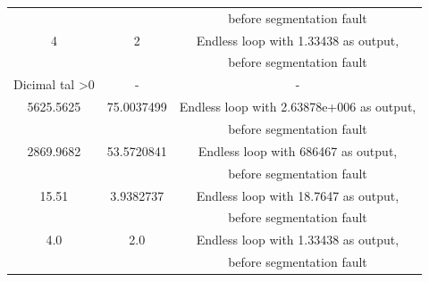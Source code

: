 \documentclass[11pt]{article}
\begin{document}
\begin{center}
\begin{tabular}{ |c|c|c| }
              && before segmentation fault \\
              4 & 2 & Endless loop with 1.33438 as output,\\ 
              && before segmentation fault \\
             Dicimal tal \textgreater 0 & - & - \\
              5625.5625 & 75.0037499 & Endless loop with 2.63878e+006 as output,\\ 
              && before segmentation fault \\
              2869.9682 & 53.5720841 & Endless loop with 686467 as output,\\ 
              && before segmentation fault \\
              15.51 & 3.9382737 & Endless loop with 18.7647 as output,\\ 
              && before segmentation fault \\
              4.0 & 2.0 & Endless loop with 1.33438 as output,\\ 
              && before segmentation fault \\
             \hline
        \end{tabular}
    \end{center}
    
\end{document}
